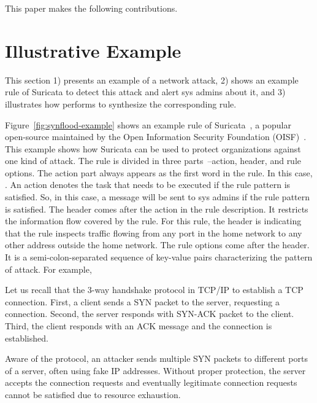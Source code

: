 \documentclass[conference]{IEEEtran}
\begin{document}


This paper makes the following contributions. 

\section{Illustrative Example}
\label{sec:suri-metas-coverage}

This section 1) presents an example of a network attack, 2) shows an
example rule of Suricata to detect this attack and alert sys admins
about it, and 3) illustrates how \tname{} performs to synthesize the
corresponding rule.

Figure~\ref{fig:synflood-example} shows an example rule of
Suricata~\cite{suricata}, a popular open-source \nids{} maintained by
the Open Information Security Foundation (OISF)~\cite{oisf}. This
example shows how Suricata can be used to protect organizations
against one kind of attack. The rule is divided in three
parts~\cite{suri-rule-format}--action, header, and rule options. The
action part always appears as the first word in the rule. In this
case, . An action denotes the task that needs to be
executed if the rule pattern is satisfied. So, in this case, a message
will be sent to sys admins if the rule pattern is satisfied. The
header comes after the action in the rule description. It restricts
the information flow covered by the rule. For this rule, the header is
 indicating that
the rule inspects  traffic flowing from any port in the
home network to any other address outside the home network. The rule
options come after the header. It is a semi-colon-separated sequence
of key-value pairs characterizing the pattern of attack. For example,


Let us recall that the 3-way handshake protocol in TCP/IP to establish
a TCP connection. First, a client sends a SYN packet to the server,
requesting a connection. Second, the server responds with SYN-ACK
packet to the client. Third, the client responds with an ACK message
and the connection is established.



Aware of the
protocol, an attacker sends multiple SYN packets to different ports of
a server, often using fake IP addresses. Without proper protection,
the server accepts the connection requests and eventually legitimate
connection requests cannot be satisfied due to resource exhaustion.
\end{document}
